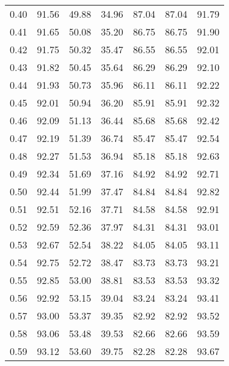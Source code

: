 \begin{tabular}{|c|c|c|c|c|c|c|}
      0.40 &     91.56 &     49.88 &      34.96 &   87.04 &      87.04 &         91.79 \\
      0.41 &     91.65 &     50.08 &      35.20 &   86.75 &      86.75 &         91.90 \\
      0.42 &     91.75 &     50.32 &      35.47 &   86.55 &      86.55 &         92.01 \\
      0.43 &     91.82 &     50.45 &      35.64 &   86.29 &      86.29 &         92.10 \\
      0.44 &     91.93 &     50.73 &      35.96 &   86.11 &      86.11 &         92.22 \\
      0.45 &     92.01 &     50.94 &      36.20 &   85.91 &      85.91 &         92.32 \\
      0.46 &     92.09 &     51.13 &      36.44 &   85.68 &      85.68 &         92.42 \\
      0.47 &     92.19 &     51.39 &      36.74 &   85.47 &      85.47 &         92.54 \\
      0.48 &     92.27 &     51.53 &      36.94 &   85.18 &      85.18 &         92.63 \\
      0.49 &     92.34 &     51.69 &      37.16 &   84.92 &      84.92 &         92.71 \\
      0.50 &     92.44 &     51.99 &      37.47 &   84.84 &      84.84 &         92.82 \\
      0.51 &     92.51 &     52.16 &      37.71 &   84.58 &      84.58 &         92.91 \\
      0.52 &     92.59 &     52.36 &      37.97 &   84.31 &      84.31 &         93.01 \\
      0.53 &     92.67 &     52.54 &      38.22 &   84.05 &      84.05 &         93.11 \\
      0.54 &     92.75 &     52.72 &      38.47 &   83.73 &      83.73 &         93.21 \\
      0.55 &     92.85 &     53.00 &      38.81 &   83.53 &      83.53 &         93.32 \\
      0.56 &     92.92 &     53.15 &      39.04 &   83.24 &      83.24 &         93.41 \\
      0.57 &     93.00 &     53.37 &      39.35 &   82.92 &      82.92 &         93.52 \\
      0.58 &     93.06 &     53.48 &      39.53 &   82.66 &      82.66 &         93.59 \\
      0.59 &     93.12 &     53.60 &      39.75 &   82.28 &      82.28 &         93.67 \\

\end{tabular}
